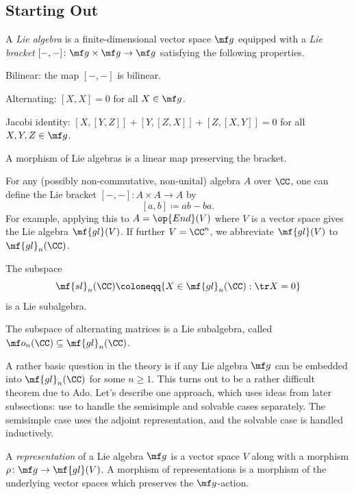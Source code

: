 \documentclass{article}
\begin{document}
\subsection{Starting Out} \label{subsec:start}
\begin{definition}
	A \textit{Lie algebra} is a finite-dimensional vector space $\mf g$ equipped with a \textit{Lie bracket} $[-,-]\colon\mf g\times\mf g\to\mf g$ satisfying the following properties.
	\begin{listroman}
		\item Bilinear: the map $[-,-]$ is bilinear.
		\item Alternating: $[X,X]=0$ for all $X\in\mf g$.
		\item Jacobi identity: $[X,[Y,Z]]+[Y,[Z,X]]+[Z,[X,Y]]=0$ for all $X,Y,Z\in\mf g$.
	\end{listroman}
	A morphism of Lie algebras is a linear map preserving the bracket.
\end{definition}
\begin{example}
	For any (possibly non-commutative, non-unital) algebra $A$ over $\CC$, one can define the Lie bracket $[-,-]\colon A\times A\to A$ by
	\[[a,b]\coloneqq ab-ba.\]
	For example, applying this to $A=\op{End}(V)$ where $V$ is a vector space gives the Lie algebra $\mf{gl}(V)$. If further $V=\CC^n$, we abbreviate $\mf{gl}(V)$ to $\mf{gl}_n(\CC)$.
\end{example}
\begin{example}
	The subspace
	\[\mf{sl}_n(\CC)\coloneqq\{X\in\mf{gl}_n(\CC):\tr X=0\}\]
	is a Lie subalgebra.
\end{example}
\begin{example}
	The subspace of alternating matrices is a Lie subalgebra, called $\mf o_n(\CC)\subseteq\mf{gl}_n(\CC)$.
\end{example}
\begin{remark}[Ado] \label{rem:ado}
	A rather basic question in the theory is if any Lie algebra $\mf g$ can be embedded into $\mf{gl}_n(\CC)$ for some $n\ge1$. This turns out to be a rather difficult theorem due to Ado. Let's describe one approach, which uses ideas from later subsections: use  to handle the semisimple and solvable cases separately. The semisimple case uses the adjoint representation, and the solvable case is handled inductively.
\end{remark}
\begin{definition}[representation]
	A \textit{representation} of a Lie algebra $\mf g$ is a vector space $V$ along with a morphism $\rho\colon\mf g\to\mf{gl}(V)$. A morphism of representations is a morphism of the underlying vector spaces which preserves the $\mf g$-action.
\end{definition}
\end{document}
